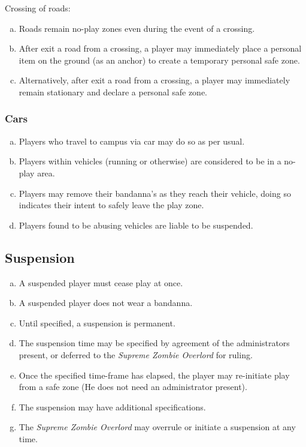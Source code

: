 \documentclass[a4paper,12pt]{article}
\begin{document}
Crossing of roads:
\begin{enumerate}[(a)]
    \item Roads remain no-play zones even during the event of a crossing.
    \item After exit a road from a crossing, a player may immediately place a personal item on the ground (as an anchor) to create a temporary personal safe zone.
    \item Alternatively, after exit a road from a crossing, a player may immediately remain stationary and declare a personal safe zone.
\end{enumerate}

\subsubsection{Cars}
\begin{enumerate}[(a)]
    \item Players who travel to campus via car may do so as per usual.
    \item Players within vehicles (running or otherwise) are considered to be in a no-play area.
    \item Players may remove their bandanna's as they reach their vehicle, doing so indicates their intent to safely leave the play zone.
    \item Players found to be abusing vehicles are liable to be suspended.
\end{enumerate}

\subsection{Suspension}

\begin{enumerate}[(a)]
    \item A suspended player must cease play at once.
    \item A suspended player does not wear a bandanna.
    \item Until specified, a suspension is permanent.
    \item The suspension time may be specified by agreement of the administrators present, or deferred to the \emph{Supreme Zombie Overlord} for ruling.
    \item Once the specified time-frame has elapsed, the player may re-initiate play from a safe zone (He does not need an administrator present).
    \item The suspension may have additional specifications.
    \item The \emph{Supreme Zombie Overlord} may overrule or initiate a suspension at any time. 
\end{enumerate}
\end{document}
